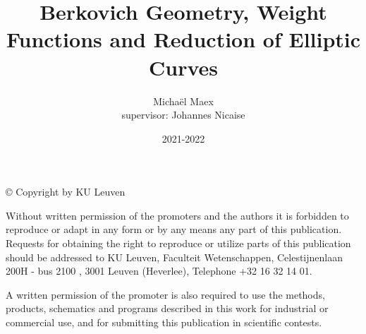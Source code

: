 \author{Michaël Maex\\ supervisor: Johannes Nicaise}
\title{Berkovich Geometry, Weight Functions and
Reduction of Elliptic Curves}
\date{2021-2022}
\vspace*{\fill}
\noindent © Copyright by KU Leuven

Without written permission of the promoters and the authors it is forbidden to reproduce or adapt in any form or by any means any part of this publication. Requests for obtaining the right to reproduce or utilize parts of this publication should be addressed to KU Leuven, Faculteit Wetenschappen, Celestijnenlaan 200H - bus 2100 , 3001 Leuven (Heverlee), Telephone +32 16 32 14 01.

A written permission of the promoter is also required to use the methods, products, schematics and programs described in this work for industrial or commercial use, and for submitting this publication in scientific contests.

\maketitle



